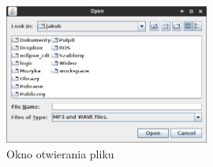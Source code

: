 \documentclass[12pt,a4paper,notitlepage]{article}
\begin{document}
\begin{figure}[hb]
 \centering
 \includegraphics[width=0.6\textwidth]{img/open.png}
 \caption{Okno otwierania pliku}
 \label{fig:open}
\end{figure}
\end{document}
